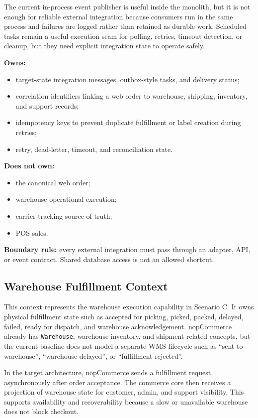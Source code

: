 The current in-process event publisher is useful inside the monolith, but it is not enough for
reliable external integration because consumers run in the same process and failures are logged
rather than retained as durable work. Scheduled tasks remain a useful execution seam for
polling, retries, timeout detection, or cleanup, but they need explicit integration state to
operate safely.

\textbf{Owns:}
\begin{itemize}
    \item target-state integration messages, outbox-style tasks, and delivery status;
    \item correlation identifiers linking a web order to warehouse, shipping, inventory, and support records;
    \item idempotency keys to prevent duplicate fulfillment or label creation during retries;
    \item retry, dead-letter, timeout, and reconciliation state.
\end{itemize}

\textbf{Does not own:}
\begin{itemize}
    \item the canonical web order;
    \item warehouse operational execution;
    \item carrier tracking source of truth;
    \item POS sales.
\end{itemize}

\textbf{Boundary rule:} every external integration must pass through an adapter, API, or event
contract. Shared database access is not an allowed shortcut.

\subsection{Warehouse Fulfillment Context}

This context represents the warehouse execution capability in Scenario C. It owns physical
fulfillment state such as accepted for picking, picked, packed, delayed, failed, ready for
dispatch, and warehouse acknowledgement. nopCommerce already has \texttt{Warehouse},
warehouse inventory, and shipment-related concepts, but the current baseline does not model a
separate WMS lifecycle such as ``sent to warehouse'', ``warehouse delayed'', or
``fulfillment rejected''.

In the target architecture, nopCommerce sends a fulfillment request asynchronously after order
acceptance. The commerce core then receives a projection of warehouse state for customer,
admin, and support visibility. This supports availability and recoverability because a slow or
unavailable warehouse does not block checkout.

